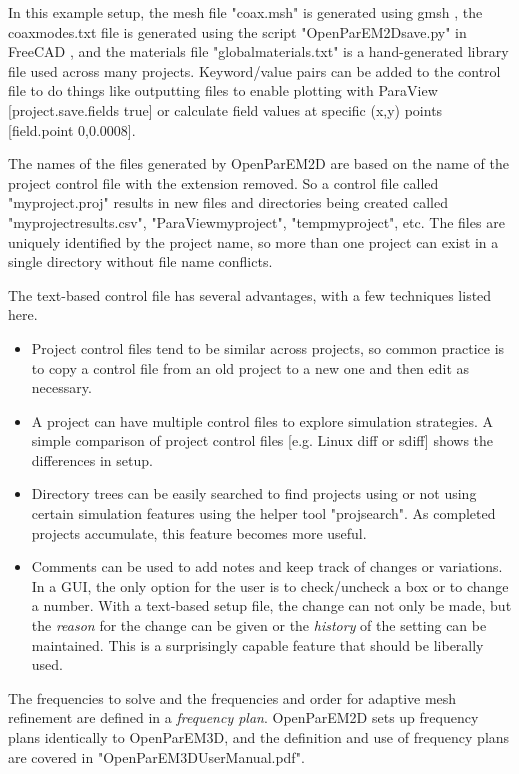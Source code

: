 \documentclass[titlepage]{article}
\renewcommand\_{\textunderscore\linebreak[1]}
\begin{document}
\noindent In this example setup, the mesh file "coax.msh" is generated using gmsh \cite{gmsh}\cite{gmshweb}, the coax\_modes.txt file is generated using the script "OpenParEM2D\_save.py" in FreeCAD \cite{FreeCAD}, and the materials file "global\_materials.txt" is a hand-generated library file used across many projects.
Keyword/value pairs can be added to the control file to do things like outputting files to enable plotting with ParaView \cite{ParaView} [project.save.fields true] or calculate field values at specific (x,y) points [field.point 0,0.0008].

The names of the files generated by OpenParEM2D are based on the name of the project control file with the extension removed.  So a control file called "my\_project.proj" results in new files and directories being created called "my\_project\_results.csv", "ParaView\_my\_project", "temp\_my\_project", etc.  The files are uniquely identified by the project name, so more than one project can exist in a single directory without file name conflicts.


The text-based control file has several advantages, with a few techniques listed here.
\begin{itemize}[nosep]
  \item Project control files tend to be similar across projects, so common practice is to copy a control file from an old project to a new one and then edit as necessary.
  \item A project can have multiple control files to explore simulation strategies.  A simple comparison of project control files [e.g. Linux diff or sdiff] shows the differences in setup.
  \item Directory trees can be easily searched to find projects using or not using certain simulation features using the helper tool "proj\_search".  As completed projects accumulate, this feature becomes more useful.
  \item Comments can be used to add notes and keep track of changes or variations.  In a GUI, the only option for the user is to check/uncheck a box or to change a number.  With a text-based setup file, the change can not only be made, but the \textit{reason} for the change can be given or the \textit{history} of the setting can be maintained.  This is a surprisingly capable feature that should be liberally used.
\end{itemize}

The frequencies to solve and the frequencies and order for adaptive mesh refinement are defined in a \textit{frequency plan}.  OpenParEM2D sets up frequency plans identically to OpenParEM3D, and the definition and use of frequency plans are covered in "OpenParEM3D\_User\_Manual.pdf".
\end{document}
